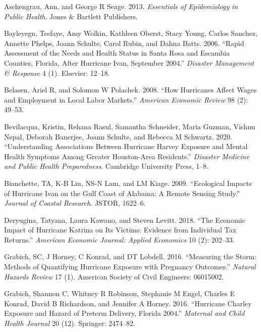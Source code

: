 \documentclass[]{article}
\begin{document}
\hypertarget{ref-aschengrau2013essentials}{}
Aschengrau, Ann, and George R Seage. 2013. \emph{Essentials of
Epidemiology in Public Health}. Jones \& Bartlett Publishers.

\hypertarget{ref-bayleyegn2006rapid}{}
Bayleyegn, Tesfaye, Amy Wolkin, Kathleen Oberst, Stacy Young, Carlos
Sanchez, Annette Phelps, Joann Schulte, Carol Rubin, and Dahna Batts.
2006. ``Rapid Assessment of the Needs and Health Status in Santa Rosa
and Escambia Counties, Florida, After Hurricane Ivan, September 2004.''
\emph{Disaster Management \& Response} 4 (1). Elsevier: 12--18.

\hypertarget{ref-belasen2008hurricanes}{}
Belasen, Ariel R, and Solomon W Polachek. 2008. ``How Hurricanes Affect
Wages and Employment in Local Labor Markets.'' \emph{American Economic
Review} 98 (2): 49--53.

\hypertarget{ref-bevilacqua2020understanding}{}
Bevilacqua, Kristin, Rehana Rasul, Samantha Schneider, Maria Guzman,
Vishnu Nepal, Deborah Banerjee, Joann Schulte, and Rebecca M Schwartz.
2020. ``Understanding Associations Between Hurricane Harvey Exposure and
Mental Health Symptoms Among Greater Houston-Area Residents.''
\emph{Disaster Medicine and Public Health Preparedness}. Cambridge
University Press, 1--8.

\hypertarget{ref-bianchette2009ecological}{}
Bianchette, TA, K-B Liu, NS-N Lam, and LM Kiage. 2009. ``Ecological
Impacts of Hurricane Ivan on the Gulf Coast of Alabama: A Remote Sensing
Study.'' \emph{Journal of Coastal Research}. JSTOR, 1622--6.

\hypertarget{ref-deryugina2018economic}{}
Deryugina, Tatyana, Laura Kawano, and Steven Levitt. 2018. ``The
Economic Impact of Hurricane Katrina on Its Victims: Evidence from
Individual Tax Returns.'' \emph{American Economic Journal: Applied
Economics} 10 (2): 202--33.

\hypertarget{ref-grabich2016measuring}{}
Grabich, SC, J Horney, C Konrad, and DT Lobdell. 2016. ``Measuring the
Storm: Methods of Quantifying Hurricane Exposure with Pregnancy
Outcomes.'' \emph{Natural Hazards Review} 17 (1). American Society of
Civil Engineers: 06015002.

\hypertarget{ref-grabich2016hurricane}{}
Grabich, Shannon C, Whitney R Robinson, Stephanie M Engel, Charles E
Konrad, David B Richardson, and Jennifer A Horney. 2016. ``Hurricane
Charley Exposure and Hazard of Preterm Delivery, Florida 2004.''
\emph{Maternal and Child Health Journal} 20 (12). Springer: 2474--82.
\end{document}

